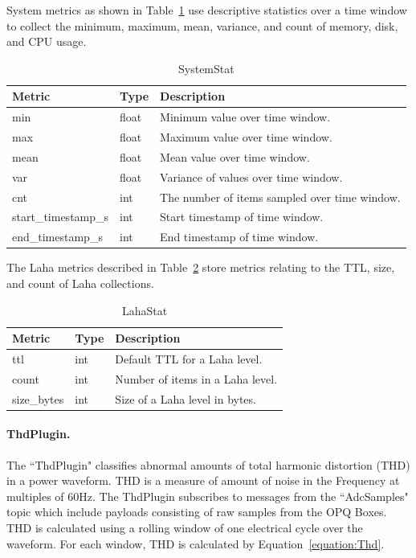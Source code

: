 System metrics as shown in Table~\ref{table:MetricsSystemStat} use descriptive statistics over a time window to collect the minimum, maximum, mean, variance, and count of memory, disk, and CPU usage.

\begin{table}[H]
	\centering
	\caption{SystemStat}
	\begin{tabularx}{\textwidth}{llX}
		\toprule
		\textbf{Metric} & \textbf{Type} & \textbf{Description} \\
		\midrule
		min & float & Minimum value over time window. \\
		max & float & Maximum value over time window. \\
		mean & float & Mean value over time window. \\
		var & float & Variance of values over time window. \\
		cnt & int & The number of items sampled over time window. \\
		start\_timestamp\_s & int & Start timestamp of time window. \\
		end\_timestamp\_s & int & End timestamp of time window. \\
		\bottomrule
	\end{tabularx}
	\label{table:MetricsSystemStat}
\end{table}


The Laha metrics described in Table~\ref{table:MetricsLaha} store metrics relating to the TTL, size, and count of Laha collections.

\begin{table}[H]
	\centering
	\caption{LahaStat}
	\begin{tabularx}{\textwidth}{llX}
		\toprule
		\textbf{Metric} & \textbf{Type} & \textbf{Description} \\
		\midrule
		ttl & int & Default TTL for a Laha level. \\
		count & int & Number of items in a Laha level. \\
		size\_bytes & int & Size of a Laha level in bytes. \\
		\bottomrule
	\end{tabularx}
	\label{table:MetricsLaha}
\end{table}

\paragraph{ThdPlugin.}
The ``ThdPlugin" classifies abnormal amounts of total harmonic distortion (THD) in a power waveform. THD is a measure of amount of noise in the Frequency at multiples of 60Hz. The ThdPlugin subscribes to messages from the ``AdcSamples" topic which include payloads consisting of raw samples from the OPQ Boxes. THD is calculated using a rolling window of one electrical cycle over the waveform. For each window, THD is calculated by Equation~\ref{equation:Thd}.

